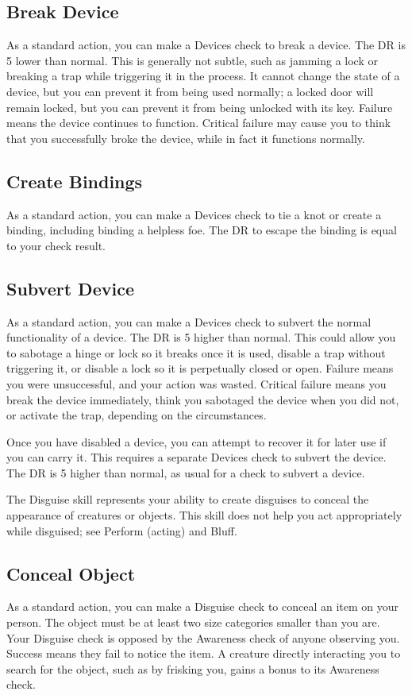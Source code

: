     \subsection{Break Device}
        As a standard action, you can make a Devices check to break a device. The DR is 5 lower than normal. This is generally not subtle, such as jamming a lock or breaking a trap while triggering it in the process. It cannot change the state of a device, but you can prevent it from being used normally; a locked door will remain locked, but you can prevent it from being unlocked with its key. Failure means the device continues to function. Critical failure may cause you to think that you successfully broke the device, while in fact it functions normally.

    \subsection{Create Bindings}
        As a standard action, you can make a Devices check to tie a knot or create a binding, including binding a helpless foe. The DR to escape the binding is equal to your check result.

    \subsection{Subvert Device}
        As a standard action, you can make a Devices check to subvert the normal functionality of a device. The DR is 5 higher than normal. This could allow you to sabotage a hinge or lock so it breaks once it is used, disable a trap without triggering it, or disable a lock so it is perpetually closed or open. Failure means you were unsuccessful, and your action was wasted. Critical failure means you break the device immediately, think you sabotaged the device when you did not, or activate the trap, depending on the circumstances.

        Once you have disabled a device, you can attempt to recover it for later use if you can carry it. This requires a separate Devices check to subvert the device. The DR is 5 higher than normal, as usual for a check to subvert a device.

        The Disguise skill represents your ability to create disguises to conceal the appearance of creatures or objects. This skill does not help you act appropriately while disguised; see Perform (acting) and Bluff.

    \subsection{Conceal Object}
        As a standard action, you can make a Disguise check to conceal an item on your person. The object must be at least two size categories smaller than you are. Your Disguise check is opposed by the Awareness check of anyone observing you. Success means they fail to notice the item. A creature directly interacting you to search for the object, such as by frisking you, gains a  bonus to its Awareness check.

